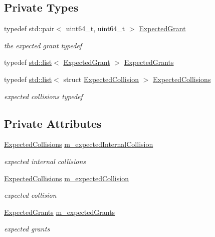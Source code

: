 \subsection*{Private Types}
\begin{DoxyCompactItemize}
\item 
typedef std\+::pair$<$ uint64\+\_\+t, uint64\+\_\+t $>$ \hyperlink{classDcfStateTest_ab4ef0fa1b9d36f663a102531dab3422e}{Expected\+Grant}
\begin{DoxyCompactList}\small\item\em the expected grant typedef \end{DoxyCompactList}\item 
typedef \hyperlink{openflow-interface_8h_afd9bcfa176617760671b67580f536fa7}{std\+::list}$<$ \hyperlink{classDcfStateTest_ab4ef0fa1b9d36f663a102531dab3422e}{Expected\+Grant} $>$ \hyperlink{classDcfStateTest_a79291047d23f458dbcd6489e54ae1f30}{Expected\+Grants}
\item 
typedef \hyperlink{openflow-interface_8h_afd9bcfa176617760671b67580f536fa7}{std\+::list}$<$ struct \hyperlink{structDcfStateTest_1_1ExpectedCollision}{Expected\+Collision} $>$ \hyperlink{classDcfStateTest_a19c48366165666efb137f2644a4027c8}{Expected\+Collisions}
\begin{DoxyCompactList}\small\item\em expected collisions typedef \end{DoxyCompactList}\end{DoxyCompactItemize}
\subsection*{Private Attributes}
\begin{DoxyCompactItemize}
\item 
\hyperlink{classDcfStateTest_a19c48366165666efb137f2644a4027c8}{Expected\+Collisions} \hyperlink{classDcfStateTest_ae10aeee5834f5953542abb8722aba1f7}{m\+\_\+expected\+Internal\+Collision}
\begin{DoxyCompactList}\small\item\em expected internal collisions \end{DoxyCompactList}\item 
\hyperlink{classDcfStateTest_a19c48366165666efb137f2644a4027c8}{Expected\+Collisions} \hyperlink{classDcfStateTest_ac7319ab0fa8df5d6878710a13b439c7f}{m\+\_\+expected\+Collision}
\begin{DoxyCompactList}\small\item\em expected collision \end{DoxyCompactList}\item 
\hyperlink{classDcfStateTest_a79291047d23f458dbcd6489e54ae1f30}{Expected\+Grants} \hyperlink{classDcfStateTest_a53daefa6aae68aebc46b1e0798a0a126}{m\+\_\+expected\+Grants}
\begin{DoxyCompactList}\small\item\em expected grants \end{DoxyCompactList}\end{DoxyCompactItemize}
